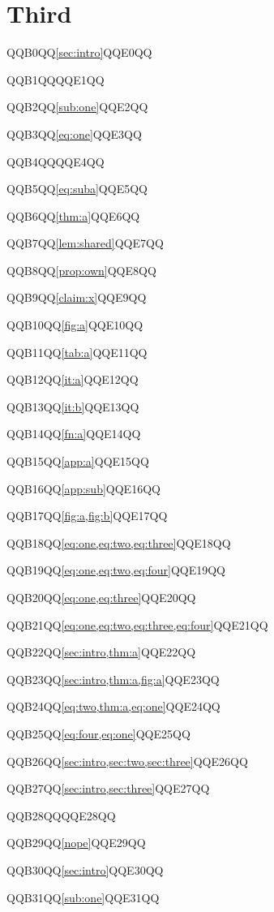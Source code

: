 \documentclass{article}
\begin{document}
\section{Third}\label{sec:three}
QQB0QQ\cref{sec:intro}QQE0QQ\par
QQB1QQQQE1QQ\par
QQB2QQ\cref{sub:one}QQE2QQ\par
QQB3QQ\cref{eq:one}QQE3QQ\par
QQB4QQQQE4QQ\par
QQB5QQ\cref{eq:suba}QQE5QQ\par
QQB6QQ\cref{thm:a}QQE6QQ\par
QQB7QQ\cref{lem:shared}QQE7QQ\par
QQB8QQ\cref{prop:own}QQE8QQ\par
QQB9QQ\cref{claim:x}QQE9QQ\par
QQB10QQ\cref{fig:a}QQE10QQ\par
QQB11QQ\cref{tab:a}QQE11QQ\par
QQB12QQ\cref{it:a}QQE12QQ\par
QQB13QQ\cref{it:b}QQE13QQ\par
QQB14QQ\cref{fn:a}QQE14QQ\par
QQB15QQ\cref{app:a}QQE15QQ\par
QQB16QQ\cref{app:sub}QQE16QQ\par
QQB17QQ\cref{fig:a,fig:b}QQE17QQ\par
QQB18QQ\cref{eq:one,eq:two,eq:three}QQE18QQ\par
QQB19QQ\cref{eq:one,eq:two,eq:four}QQE19QQ\par
QQB20QQ\cref{eq:one,eq:three}QQE20QQ\par
QQB21QQ\cref{eq:one,eq:two,eq:three,eq:four}QQE21QQ\par
QQB22QQ\cref{sec:intro,thm:a}QQE22QQ\par
QQB23QQ\cref{sec:intro,thm:a,fig:a}QQE23QQ\par
QQB24QQ\cref{eq:two,thm:a,eq:one}QQE24QQ\par
QQB25QQ\cref{eq:four,eq:one}QQE25QQ\par
QQB26QQ\cref{sec:intro,sec:two,sec:three}QQE26QQ\par
QQB27QQ\cref{sec:intro,sec:three}QQE27QQ\par
QQB28QQQQE28QQ\par
QQB29QQ\cref{nope}QQE29QQ\par
QQB30QQ\autoref{sec:intro}QQE30QQ\par
QQB31QQ\autoref{sub:one}QQE31QQ\par
\end{document}
